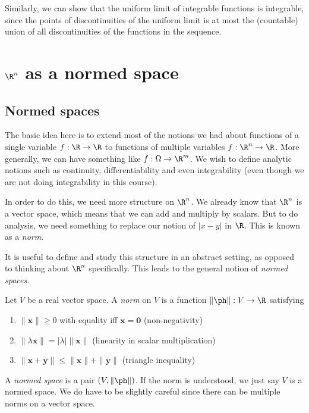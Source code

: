 \documentclass[a4paper]{article}
\begin{document}
Similarly, we can show that the uniform limit of integrable functions is integrable, since the points of discontinuities of the uniform limit is at most the (countable) union of all discontinuities of the functions in the sequence.

\section{\texorpdfstring{$\R^n$}{Rn} as a normed space}
\subsection{Normed spaces}
The basic idea here is to extend most of the notions we had about functions of a single variable $f: \R \to \R$ to functions of multiple variables $f: \R^n \to \R$. More generally, we can have something like $f: \Omega \to \R^m$. We wish to define analytic notions such as continuity, differentiability and even integrability (even though we are not doing integrability in this course).

In order to do this, we need more structure on $\R^n$. We already know that $\R^n$ is a vector space, which means that we can add and multiply by scalars. But to do analysis, we need something to replace our notion of $|x - y|$ in $\R$. This is known as a \emph{norm}.

It is useful to define and study this structure in an abstract setting, as opposed to thinking about $\R^n$ specifically. This leads to the general notion of \emph{normed spaces}.

\begin{defi}
  Let $V$ be a real vector space. A \emph{norm} on $V$ is a function $\|\ph \|: V\to \R$ satisfying
  \begin{enumerate}
    \item $\|\mathbf{x}\| \geq 0$ with equality iff $\mathbf{x} = \mathbf{0}$ \hfill (non-negativity)
    \item $\|\lambda \mathbf{x}\| = |\lambda|\|\mathbf{x}\|$ \hfill (linearity in scalar multiplication)
    \item $\|\mathbf{x} + \mathbf{y}\| \leq \|\mathbf{x} \| + \|\mathbf{y}\|$ \hfill (triangle inequality)
  \end{enumerate}
  A \emph{normed space} is a pair $(V, \|\ph \|)$. If the norm is understood, we just say $V$ is a normed space. We do have to be slightly careful since there can be multiple norms on a vector space.
\end{defi}
\end{document}
